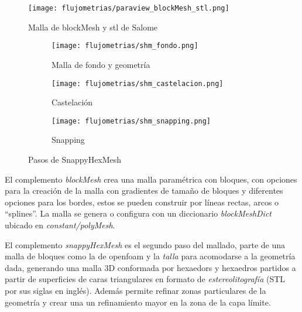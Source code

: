 \begin{figure}
    \centering
    \texttt{[image: flujometrias/paraview\_blockMesh\_stl.png]}
    \caption{Malla de blockMesh y stl de Salome}\label{fig:paraview_blockMesh_stl}
\end{figure}

\begin{figure}[t!]
    \centering
    \begin{subfigure}[t]{0.5\textwidth}
        \centering
        \texttt{[image: flujometrias/shm\_fondo.png]}
        \caption{Malla de fondo y geometría}
    \end{subfigure}%
    \begin{subfigure}[t]{0.5\textwidth}
        \centering
        \texttt{[image: flujometrias/shm\_castelacion.png]}
        \caption{Castelación}
    \end{subfigure}
    \begin{subfigure}[t]{0.5\textwidth}
        \centering
        \texttt{[image: flujometrias/shm\_snapping.png]}
        \caption{Snapping}
    \end{subfigure}
    \caption{Pasos de SnappyHexMesh\parencite{shm_steps}}\label{fig:openfoam_shm_pasos}
\end{figure}


El complemento \emph{blockMesh} crea una malla paramétrica con bloques, con
opciones para la creación de la malla con gradientes de tamaño de bloques y
diferentes opciones para los bordes, estos se pueden construir por líneas
rectas, arcos o ``splines''.
%
La malla se genera o configura con un diccionario \emph{blockMeshDict} ubicado
en \emph{constant/polyMesh}.

El complemento \emph{snappyHexMesh} es el segundo paso del mallado,  parte de
una malla de bloques como la de openfoam y la \emph{talla} para acomodarse a la
geometría dada, generando una malla 3D conformada por hexaedors y hexaedros
partidos a partir de superficies de caras triangulares en formato de
\emph{estereolitografía} (STL por sus siglas en inglés).
%
Además permite refinar zonas particulares de la geometría y crear una un
refinamiento mayor en la zona de la capa límite.



